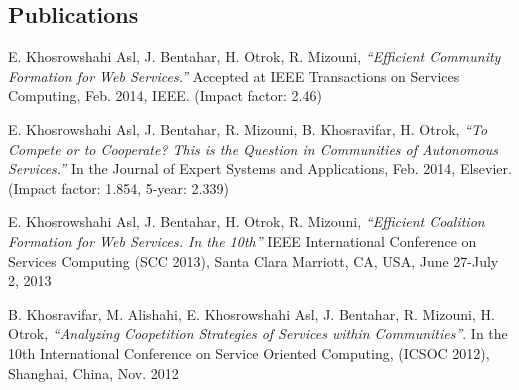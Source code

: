 

\subsection {Publications }

    \begin{enumerate}
        \small{
        \item E. Khosrowshahi Asl, J. Bentahar, H. Otrok, R. Mizouni, \emph{``Efficient Community Formation for Web Services.''} Accepted at IEEE Transactions on Services Computing, Feb. 2014, IEEE. (Impact factor: 2.46)
        \item E. Khosrowshahi Asl, J. Bentahar, R. Mizouni, B. Khosravifar, H. Otrok, \emph{``To Compete or to Cooperate? This is the Question in Communities of Autonomous Services.''} In the Journal of Expert Systems and Applications, Feb. 2014, Elsevier. (Impact factor: 1.854, 5-year:  2.339)
        \item E. Khosrowshahi Asl, J. Bentahar, H. Otrok, R. Mizouni, \emph{``Efficient Coalition Formation for Web Services. In the 10th''} IEEE  International Conference on Services Computing (SCC 2013), Santa Clara Marriott, CA, USA, June 27-July 2, 2013
        \item B. Khosravifar, M. Alishahi, E. Khosrowshahi Asl, J. Bentahar, R. Mizouni, H. Otrok, \emph{``Analyzing Coopetition Strategies of Services within Communities''}. In the 10th International Conference on Service Oriented Computing, (ICSOC 2012), Shanghai, China, Nov. 2012
        }
    \end{enumerate}

